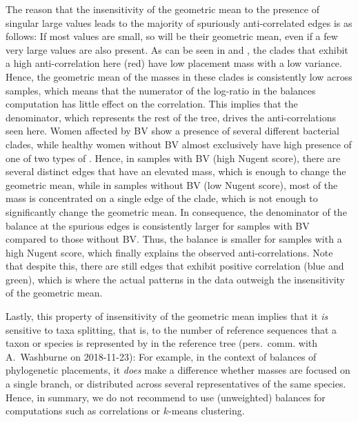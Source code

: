 The reason that the insensitivity of the geometric mean to the presence of singular large values
leads to the majority of spuriously anti-correlated edges is as follows:
If most values are small, so will be their geometric mean, even if a few very large values are also present.
As can be seen in  and ,
the clades that exhibit a high anti-correlation here (red) have low placement mass with a low variance.
Hence, the geometric mean of the masses in these clades is consistently low across samples,
which means that the numerator of the log-ratio in the balances computation has little effect on the correlation.
This implies that the denominator, which represents the rest of the tree, drives the anti-correlations seen here.
Women affected by \ac{BV} show a presence of several different bacterial clades,
while healthy women without \ac{BV} almost exclusively have high presence
of one of two types of  \cite{Srinivasan2012}.
Hence, in samples with \ac{BV} (high Nugent score), there are several distinct edges that have an elevated mass,
which is enough to change the geometric mean,
while in samples without \ac{BV} (low Nugent score),
most of the mass is concentrated on a single edge of the  clade,
which is not enough to significantly change the geometric mean.
In consequence, the denominator of the balance at the spurious edges is consistently larger
for samples with \ac{BV} compared to those without \ac{BV}.
Thus, the balance is smaller for samples with a high Nugent score,
which finally explains the observed anti-correlations.
Note that despite this, there are still edges that exhibit positive correlation (blue and green),
which is where the actual patterns in the data outweigh the insensitivity of the geometric mean.

Lastly, this property of insensitivity of the geometric mean implies that it \emph{is} sensitive to taxa splitting,
that is, to the number of reference sequences that a taxon or species is represented by in the reference tree
(pers.~comm. with A.~Washburne on 2018-11-23):
For example, in the context of balances of phylogenetic placements,
it \emph{does} make a difference whether masses are focused on a single branch,
or distributed across several representatives of the same species.
Hence, in summary,
we do not recommend to use (unweighted) balances for computations such as correlations or $k$-means clustering.

